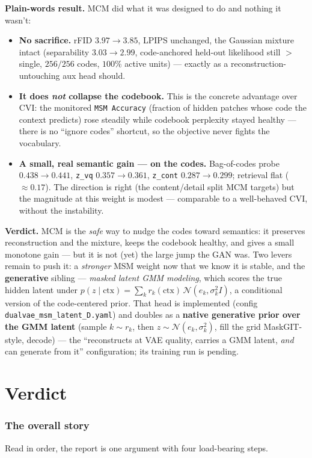 \documentclass[11pt]{article}
\begin{document}
\textbf{Plain-words result.} MCM did what it was designed to do and nothing it wasn't:
\begin{itemize}
  \item \textbf{No sacrifice.} rFID $3.97\!\to\!3.85$, LPIPS unchanged, the Gaussian mixture intact
  (separability $3.03\!\to\!2.99$, code-anchored held-out likelihood still $>$ single, $256/256$ codes,
  $100\%$ active units) --- exactly as a reconstruction-untouching aux head should.
  \item \textbf{It does \emph{not} collapse the codebook.} This is the concrete advantage over CVI: the
  monitored \texttt{MSM Accuracy} (fraction of hidden patches whose code the context predicts) rose
  steadily while codebook perplexity stayed healthy --- there is no ``ignore codes'' shortcut, so the
  objective never fights the vocabulary.
  \item \textbf{A small, real semantic gain --- on the codes.} Bag-of-codes probe
  $0.438\!\to\!0.441$, \texttt{z\_vq} $0.357\!\to\!0.361$, \texttt{z\_cont} $0.287\!\to\!0.299$;
  retrieval flat ($\approx0.17$). The direction is right (the content/detail split MCM targets) but the
  magnitude at this weight is modest --- comparable to a well-behaved CVI, without the instability.
\end{itemize}
\textbf{Verdict.} MCM is the \emph{safe} way to nudge the codes toward semantics: it preserves
reconstruction and the mixture, keeps the codebook healthy, and gives a small monotone gain --- but it
is not (yet) the large jump the GAN was. Two levers remain to push it: a \emph{stronger} MSM weight now
that we know it is stable, and the \textbf{generative} sibling --- \emph{masked latent GMM modeling},
which scores the true hidden latent under $p(z\mid\text{ctx})=\sum_k r_k(\text{ctx})\,\mathcal{N}(e_k,
\sigma_k^2 I)$, a conditional version of the code-centered prior. That head is implemented (config
\texttt{dualvae\_msm\_latent\_D.yaml}) and doubles as a \textbf{native generative prior over the GMM
latent} (sample $k\sim r_k$, then $z\sim\mathcal{N}(e_k,\sigma_k^2)$, fill the grid MaskGIT-style,
decode) --- the ``reconstructs at VAE quality, carries a GMM latent, \emph{and} can generate from it''
configuration; its training run is pending.

\part{Verdict}

\section{The overall story}
\label{sec:story}
Read in order, the report is one argument with four load-bearing steps.
\end{document}
